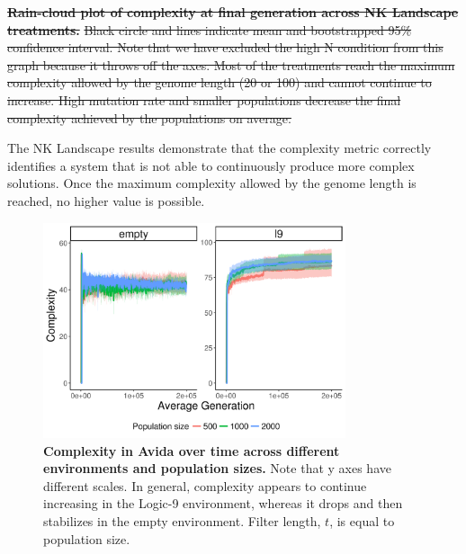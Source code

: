\documentclass[letterpaper]{article}
\providecommand{\DIFdeltex}[1]{{\protect\color{red}\sout{#1}}}                      %
\providecommand{\DIFdelbegin}{} %
\providecommand{\DIFdelend}{} %
\providecommand{\DIFdelFL}[1]{\DIFdel{#1}} %
\providecommand{\DIFaddbeginFL}{} %
\providecommand{\DIFaddendFL}{} %
\providecommand{\DIFdelbeginFL}{} %
\providecommand{\DIFdelendFL}{} %
\providecommand{\DIFdel}[1]{\texorpdfstring{\DIFdeltex{#1}}{}} %
\begin{document}
\DIFdelbegin %
{%
\textbf{\DIFdelFL{Rain-cloud plot of complexity at final generation across NK Landscape treatments.}} %
\DIFdelFL{Black circle and lines indicate mean and bootstrapped 95\% confidence interval. Note that we have excluded the high N condition from this graph because it throws off the axes. Most of the treatments reach the maximum complexity allowed by the genome length (20 or 100) and cannot continue to increase. High mutation rate and smaller populations decrease the final complexity achieved by the populations on average.}}

\DIFdelend The NK Landscape results demonstrate that the complexity metric correctly identifies a system that is not able to continuously produce more complex solutions. Once the maximum complexity allowed by the genome length is reached, no higher value is possible. 

\begin{figure}
    \centering
    \DIFdelbeginFL %
\DIFdelendFL \DIFaddbeginFL \includegraphics[width=3.5in]{figs/dolson.avida_env_complexity.png}
    \DIFaddendFL \caption{\textbf{Complexity in Avida over time across different environments and population sizes.} Note that y axes have different scales. In general, complexity appears to continue increasing in the Logic-9 environment, whereas it drops and then stabilizes in the empty environment. Filter length, $t$, is equal to population size.    \DIFdelbeginFL %
\DIFdelendFL \label{fig:avida_env_complexity}\DIFaddbeginFL }
\DIFaddendFL \end{figure}
\end{document}
